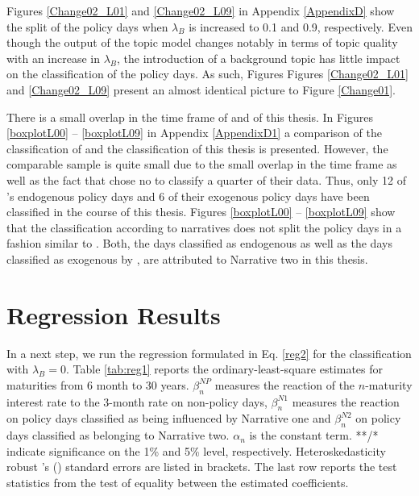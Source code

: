 \documentclass[11pt,a4paper,english,oneside]{book}
\numberwithin{equation}{chapter}
\begin{document}
Figures \ref{Change02_L01} and \ref{Change02_L09} in Appendix \ref{AppendixD} show the split of the policy days when $\lambda_B$ is increased to 0.1 and 0.9, respectively. Even though the output of the topic model changes notably in terms of topic quality with an increase in $\lambda_B$, the introduction of a background topic has little impact on the classification of the policy days. As such, Figures Figures \ref{Change02_L01} and \ref{Change02_L09} present an almost identical picture to Figure \ref{Change01}.

There is a small overlap in the time frame of \cite{Ellingsen.2003} and of this thesis. In Figures \ref{boxplotL00} -- \ref{boxplotL09} in Appendix \ref{AppendixD1} a comparison of the classification of \citeauthor{Ellingsen.2003} and the classification of this thesis is presented. However, the comparable sample is quite small due to the small overlap in the time frame as well as the fact that \citeauthor{Ellingsen.2003} chose no to classify a quarter of their data. Thus, only 12 of \citeauthor{Ellingsen.2003}'s endogenous policy days and 6 of their exogenous policy days have been classified in the course of this thesis. Figures \ref{boxplotL00} -- \ref{boxplotL09} show that the classification according to narratives does not split the policy days in a fashion similar to \citeauthor{Ellingsen.2003}. Both, the days classified as endogenous as well as the days classified as exogenous by \citeauthor{Ellingsen.2003}, are attributed to Narrative two in this thesis.  
 
\section{Regression Results}\label{Ch:regressionresults}
In a next step, we run the regression formulated in Eq. \ref{reg2} for the  classification with $\lambda_B =0$. Table \ref{tab:reg1} reports the ordinary-least-square estimates for maturities from 6 month to 30 years. $\beta_n^{NP}$ measures the reaction of the $n$-maturity interest rate to the 3-month rate on non-policy days, $\beta_n^{N1}$ measures the reaction on policy days classified as being influenced by Narrative one and $\beta_n^{N2}$ on policy days classified as belonging to Narrative two. $\alpha_n$ is the constant term. **/* indicate significance on the 1\% and 5\% level, respectively. Heteroskedasticity robust \citeauthor{White.1980}'s (\citeyear{White.1980}) standard errors are listed in brackets. The last row reports the test statistics from the test of equality between the estimated coefficients.
\end{document}

